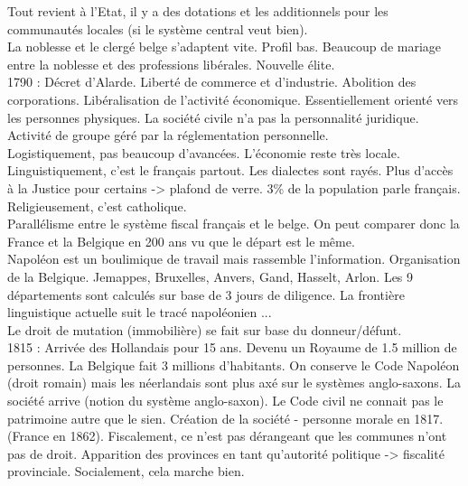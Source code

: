 \documentclass{book}
\begin{document}
Tout revient à l'Etat, il y a des dotations et les additionnels pour les communautés locales (si le système central veut bien).\\

La noblesse et le clergé belge s'adaptent vite. Profil bas. Beaucoup de mariage entre la noblesse et des professions libérales. Nouvelle élite.\\

1790 : Décret d'Alarde. Liberté de commerce et d'industrie. Abolition des corporations. Libéralisation de l'activité économique. Essentiellement orienté vers les personnes physiques. La société civile n'a pas la personnalité juridique. Activité de groupe géré par la réglementation personnelle.\\

Logistiquement, pas beaucoup d'avancées. L'économie reste très locale. Linguistiquement, c'est le français partout. Les dialectes sont rayés. Plus d'accès à la Justice pour certains -> plafond de verre. 3\% de la population parle français. Religieusement, c'est catholique.\\

Parallélisme entre le système fiscal français et le belge. On peut comparer donc la France et la Belgique en 200 ans vu que le départ est le même. \\

Napoléon est un boulimique de travail mais rassemble l'information. Organisation de la Belgique. Jemappes, Bruxelles, Anvers, Gand, Hasselt, Arlon. Les 9 départements sont calculés sur base de 3 jours de diligence. La frontière linguistique actuelle suit le tracé napoléonien ...\\

Le droit de mutation (immobilière) se fait sur base du donneur/défunt.\\


1815 : Arrivée des Hollandais pour 15 ans. Devenu un Royaume de 1.5 million de personnes. La Belgique fait 3 millions d'habitants. On conserve le Code Napoléon (droit romain) mais les néerlandais sont plus axé sur le systèmes anglo-saxons. La société arrive (notion du système anglo-saxon). Le Code civil ne connait pas le patrimoine autre que le sien. Création de la société - personne morale en 1817. (France en 1862). Fiscalement, ce n'est pas dérangeant que les communes n'ont pas de droit. Apparition des provinces en tant qu'autorité politique -> fiscalité provinciale. Socialement, cela marche bien. \\
\end{document}
